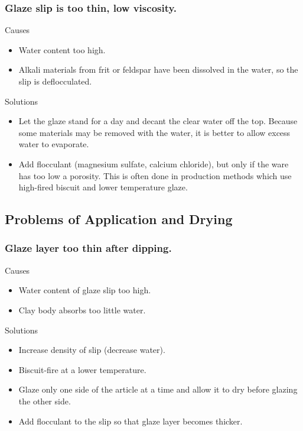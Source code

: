 \subsubsection{Glaze slip is too thin, low viscosity.}
Causes
\begin{itemize}
  \item Water content too high.
  \item Alkali materials from frit or feldspar have been dissolved in the 
  water, so the slip is deflocculated.
\end{itemize}
Solutions
\begin{itemize}
  \item Let the glaze stand for a day and decant the clear water off the top. 
  Because some materials may be removed with the water, it is better to allow 
  excess water to evaporate.
  \item Add flocculant (magnesium sulfate, calcium chloride), but only if the 
  ware has too low a porosity. This is often done in production methods which 
  use high-fired biscuit and lower temperature glaze.
\end{itemize}
\subsection{Problems of Application and Drying}
\label{sec:problemapplication}
\subsubsection{Glaze layer too thin after dipping.}
Causes
\begin{itemize}
\item Water content of glaze slip too high.
\item Clay body absorbs too little water.
\end{itemize}
Solutions
\begin{itemize}
\item Increase density of slip (decrease water).
\item Biscuit-fire at a lower temperature.
\item Glaze only one side of the article at a time and allow it to dry before 
glazing the other side.
\item Add flocculant to the slip so that glaze layer becomes thicker.
\end{itemize}

